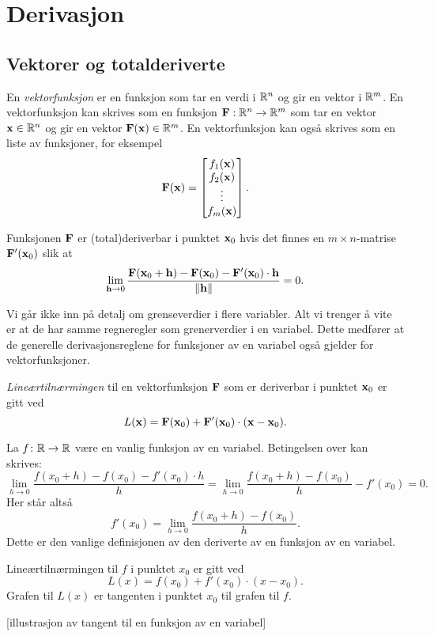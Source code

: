 \section{Derivasjon}
\subsection{Vektorer og totalderiverte}
En {\em vektorfunksjon} er en funksjon som tar en verdi i $\mathbb{R}^n$ og gir en
vektor i $\mathbb{R}^m$. En vektorfunksjon kan skrives som en funksjon
$\mathbf{F}:\mathbb{R}^n\to\mathbb{R}^m$ som tar en vektor $\mathbf{x}\in\mathbb{R}^n$ og gir en vektor
$\mathbf{F}(\mathbf{x})\in\mathbb{R}^m$. En vektorfunksjon kan også skrives som en liste av
funksjoner, for eksempel
$$\mathbf{F}(\mathbf{x}) = \begin{bmatrix} f_1(\mathbf{x}) \\ f_2(\mathbf{x}) \\ \vdots \\ f_m(\mathbf{x}) \end{bmatrix}.$$

\begin{definisjon}
Funksjonen $\mathbf{F}$ er (total)deriverbar i punktet $\mathbf{x}_0$ hvis det finnes en $m \times n$-matrise $\mathbf{F}'(\mathbf{x}_0)$ slik at
$$\lim_{\mathbf{h}\to 0} \frac{\mathbf{F}(\mathbf{x}_0+\mathbf{h}) - \mathbf{F}(\mathbf{x}_0) -
\mathbf{F}'(\mathbf{x}_0) \cdot \mathbf{h}}{\|\mathbf{h}\|} = 0.$$
\end{definisjon}


Vi går ikke inn på detalj om grenseverdier i flere variabler. Alt vi trenger å
vite er at de har samme regneregler som
grenerverdier i en variabel.
Dette medfører at de generelle derivasjonsreglene for funksjoner av en variabel også gjelder for vektorfunksjoner.

\begin{definisjon}
  {\em Lineærtilnærmingen} til en vektorfunksjon $\mathbf{F}$ som er deriverbar i punktet $\mathbf{x}_0$ er
  gitt ved
  $$L(\mathbf{x}) = \mathbf{F}(\mathbf{x}_0) + \mathbf{F}'(\mathbf{x}_0) \cdot (\mathbf{x} - \mathbf{x}_0).$$
\end{definisjon}

\begin{eksempel}
  La $f \colon \mathbb{R} \to \mathbb{R}$ være en vanlig funksjon av en variabel. Betingelsen over kan skrives:
  $$\lim_{h\to 0} \frac{f(x_0+h) - f(x_0) - f'(x_0) \cdot h}{h} =
  \lim_{h\to 0} \frac{f(x_0+h) - f(x_0)}{h} - f'(x_0) = 0.$$
  Her står altså 
  $$f'(x_0) = \lim_{h\to 0} \frac{f(x_0+h) - f(x_0)}{h}.$$
  Dette er den vanlige definisjonen av den deriverte av en funksjon av en variabel.

  Lineærtilnærmingen til $f$ i punktet $x_0$ er gitt ved
  $$L(x) = f(x_0) + f'(x_0) \cdot (x - x_0).$$
  Grafen til $L(x)$ er tangenten i punktet $x_0$ til grafen til $f$.
\end{eksempel}
[illustrasjon av tangent til en funksjon av en variabel]

